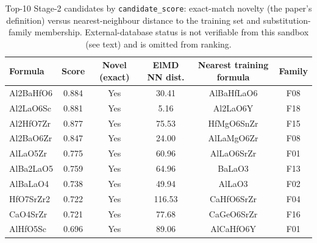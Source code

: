 \begin{table}[htbp]
\centering
\caption{Top-10 Stage-2 candidates by \texttt{candidate\_score}: exact-match novelty (the paper's definition) versus nearest-neighbour distance to the training set and substitution-family membership. External-database status is not verifiable from this sandbox (see text) and is omitted from ranking.}
\label{tab:a3_top10}
\begin{tabular}{lccccc}
\toprule
Formula & Score & Novel (exact) & ElMD NN dist. & Nearest training formula & Family \\
\midrule
Al2BaHfO6 & 0.884 & Yes & 30.41 & AlBaHfLaO6 & F08 \\
Al2LaO6Sc & 0.881 & Yes & 5.16 & Al2LaO6Y & F18 \\
Al2HfO7Zr & 0.877 & Yes & 75.53 & HfMgO6SnZr & F15 \\
Al2BaO6Zr & 0.847 & Yes & 24.00 & AlLaMgO6Zr & F08 \\
AlLaO5Zr & 0.775 & Yes & 60.96 & AlLaO6SrZr & F01 \\
AlBa2LaO5 & 0.759 & Yes & 64.96 & BaLaO3 & F13 \\
AlBaLaO4 & 0.738 & Yes & 49.94 & AlLaO3 & F02 \\
HfO7SrZr2 & 0.722 & Yes & 116.53 & CaHfO6SrZr & F04 \\
CaO4SrZr & 0.721 & Yes & 77.68 & CaGeO6SrZr & F16 \\
AlHfO5Sc & 0.696 & Yes & 89.06 & AlCaHfO6Y & F01 \\
\bottomrule
\end{tabular}
\end{table}
